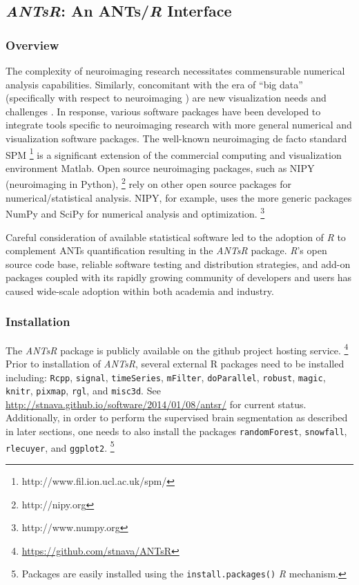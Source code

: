 \documentclass[final,5p,times,twocolumn]{elsarticle}
\begin{document}
\subsection{\textit{ANTsR}:  An ANTs/\textit{R} Interface}

\subsubsection{Overview}

The complexity of neuroimaging research necessitates 
commensurable numerical analysis capabilities.  Similarly, concomitant
with the era of ``big data'' (specifically with respect to neuroimaging
\citep{vanhorn2013}) are new visualization needs and challenges
\citep{childs2013,kehrer2013}.
In response, various software packages have been developed to
integrate tools specific to neuroimaging research with more general
numerical and visualization software packages.
The well-known neuroimaging de facto standard SPM%
\footnote{
http://www.fil.ion.ucl.ac.uk/spm/
}
is a significant extension of the commercial computing and visualization environment
Matlab.  Open source neuroimaging packages, such as NIPY (neuroimaging in Python),%
\footnote{
http://nipy.org
} 
rely on other open source packages for numerical/statistical analysis.  NIPY,
for example, uses the more generic packages NumPy and SciPy for numerical analysis and 
optimization.%
\footnote{
http://www.numpy.org
}  

Careful consideration of available statistical software 
led to the adoption of \textit{R} to complement ANTs quantification resulting in the
\textit{ANTsR} package.
\textit{R}'s open source code base, reliable software testing and distribution strategies,
and add-on packages coupled with its rapidly growing 
community of developers and users has caused wide-scale
adoption within both academia and industry.

\subsubsection{Installation}

The \textit{ANTsR} package is publicly available on the github project hosting service.%
\footnote{
\href{https://github.com/stnava/ANTsR}{https://github.com/stnava/ANTsR}
}
Prior to installation of \textit{ANTsR}, several external R packages
need to be installed including: \verb#Rcpp#, \verb#signal#, \verb#timeSeries#, 
\verb#mFilter#, \verb#doParallel#, \verb#robust#, \verb#magic#, \verb#knitr#, \verb#pixmap#, 
\verb#rgl#, and \verb#misc3d#.  
See \href{http://stnava.github.io/software/2014/01/08/antsr/}{http://stnava.github.io/software/2014/01/08/antsr/} for current status. 
Additionally, in order
to perform the supervised brain segmentation as described 
in later sections, one needs to also install the packages
\verb#randomForest#, \verb#snowfall#, \verb#rlecuyer#,
and \verb#ggplot2#.%
\footnote{
Packages are easily installed using the {\tt install.packages()} \textit{R} mechanism.
} 
\end{document}
